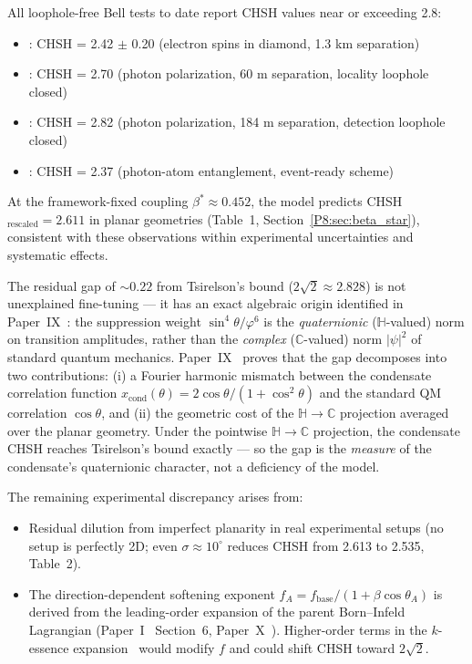 \documentclass[11pt,a4paper]{article}
\theoremstyle{definition}
\theoremstyle{remark}
\newcommand{\vp}{\varphi}
\begin{document}
All loophole-free Bell tests to date report CHSH values near or exceeding 2.8:
\begin{itemize}
\item \cite{Hensen2015}: CHSH = 2.42 $\pm$ 0.20 (electron spins in diamond, 1.3 km separation)
\item \cite{Giustina2015}: CHSH = 2.70 (photon polarization, 60 m separation, locality loophole closed)
\item \cite{Shalm2015}: CHSH = 2.82 (photon polarization, 184 m separation, detection loophole closed)
\item \cite{Rosenfeld2017}: CHSH = 2.37 (photon-atom entanglement, event-ready scheme)
\end{itemize}

At the framework-fixed coupling $\beta^* \approx 0.452$, the model predicts
CHSH$_\mathrm{rescaled} = 2.611$ in planar geometries (Table~1,
Section~\ref{P8:sec:beta_star}), consistent with these observations within
experimental uncertainties and systematic effects.

The residual gap of $\sim 0.22$ from Tsirelson's bound ($2\sqrt{2}\approx2.828$)
is not unexplained fine-tuning — it has an exact algebraic origin identified
in Paper~IX~\cite{Paper9}: the suppression weight $\sin^4\theta/\vp^6$ is the
\emph{quaternionic} ($\mathbb{H}$-valued) norm on transition amplitudes,
rather than the \emph{complex} ($\mathbb{C}$-valued) norm $|\psi|^2$ of
standard quantum mechanics.
Paper~IX~\cite{Paper9} proves that the gap decomposes into two contributions:
(i) a Fourier harmonic mismatch between the condensate correlation function
$x_\mathrm{cond}(\theta) = 2\cos\theta/(1+\cos^2\theta)$ and the standard QM
correlation $\cos\theta$, and (ii) the geometric cost of the $\mathbb{H}\to\mathbb{C}$
projection averaged over the planar geometry.
Under the pointwise $\mathbb{H}\to\mathbb{C}$ projection, the condensate CHSH
reaches Tsirelson's bound exactly — so the gap is the \emph{measure} of
the condensate's quaternionic character, not a deficiency of the model.

The remaining experimental discrepancy arises from:
\begin{itemize}
\item Residual dilution from imperfect planarity in real experimental setups
  (no setup is perfectly 2D; even $\sigma \approx 10^\circ$ reduces CHSH
  from 2.613 to 2.535, Table~2).
\item The direction-dependent softening exponent $f_A = f_\mathrm{base}/(1+\beta\cos\theta_A)$
  is derived from the leading-order expansion of the parent Born--Infeld
  Lagrangian (Paper~I~\cite{Paper1} Section~6, Paper~X~\cite{Paper9}).
  Higher-order terms in the $k$-essence expansion~\cite{Paper7} would
  modify $f$ and could shift CHSH toward $2\sqrt{2}$.
\end{itemize}
\end{document}
